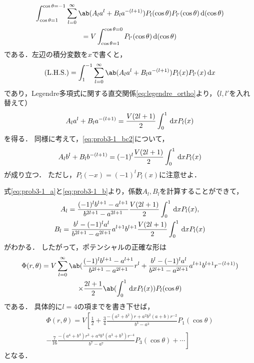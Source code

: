 \begin{multline}%
  \int_{\cos\theta=1}^{\cos\theta=-1} \sum_{l=0}^\infty\ab(A_la^l + B_la^{-(l+1)})
  P_l(\cos\theta) P_{l'}(\cos\theta) \dl{(\cos\theta)} \\
  =  V \int_{\cos\theta=1}^{\cos\theta=0} P_{l'}(\cos\theta) \dl{(\cos\theta)}
\end{multline}%
である．左辺の積分変数を$x$で書くと，
\begin{gather}%
  \text{(L.H.S.)} = \int_{1}^{-1} \sum_{l=0}^\infty\ab(A_l a^l + B_l a^{-(l+1)})
  P_l(x) P_{l'}(x) \dl{x}
\end{gather}
であり，Legendre多項式に関する直交関係\eqref{eq:legendre_ortho}より，（$l,l'$を入れ替えて）
\begin{gather}%
  \label{eq:prob3-1_a}
  A_l a^l + B_l a^{-(l+1)} = \frac{V(2l+1)}{2} \int_0^1 \dl{x} P_l(x)
\end{gather}%
を得る．
同様に考えて，\eqref{eq:prob3-1_bc2}について，
\begin{gather}%
  \label{eq:prob3-1_b}
  A_l b^l + B_l b^{-(l+1)} =(-1)^l \frac{V(2l+1)}{2} \int_0^{1} \dl{x} P_l(x)
\end{gather}%
が成り立つ．
ただし，$P_l(-x) = (-1)^l P_l(x)$に注意せよ．

式\eqref{eq:prob3-1_a}と\eqref{eq:prob3-1_b}より，係数$A_l, B_l$を計算することができて，
\begin{gather}%
  A_l = \frac{(-1)^lb^{l+1}-a^{l+1}}{b^{2l+1}-a^{2l+1}}
  \frac{V(2l+1)}{2} \int_0^1 \dl{x} P_l(x),\\
  B_l = \frac{b^l-(-1)^la^l}{b^{2l+1}-a^{2l+1}}a^{l+1}b^{l+1}
  \frac{V(2l+1)}{2}\int_0^1 \dl{x} P_l(x)
\end{gather}%
がわかる．
したがって，ポテンシャルの正確な形は
\begin{multline}
  \Phi(r,\theta) =
  V \sum_{l=0}^\infty \ab(
  \frac{(-1)^lb^{l+1}-a^{l+1}}{b^{2l+1}-a^{2l+1}} r^l +
  \frac{b^l-(-1)^la^l}{b^{2l+1}-a^{2l+1}}a^{l+1}b^{l+1} r^{-(l+1)}
  )\\
  \times\frac{2l+1}{2}\ab(\int_0^1 \dl{x} P_l(x))
  P_l(\cos\theta)
\end{multline}
である．
具体的に$l = 4$の項までを書き下せば，
\begin{multline}
  \Phi(r,\theta) = V \left[
    \frac{1}{2} + \frac{3}{4}\frac{-(a^2+b^2)r+a^2b^2(a+b)r^{-2}}{b^3-a^3} P_1(\cos\theta)\right.\\
    \left.
    -\frac{7}{16}\frac{-(a^4+b^4)r^3 + a^4b^4(a^3+b^3)r^{-4}}{b^7-a^7}P_3(\cos\theta) +\cdots
    \right]
\end{multline}
となる．

